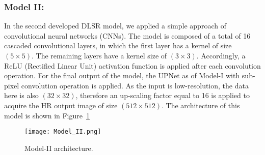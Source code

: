 \subsubsection{Model II:}
In the second developed DLSR model, we applied a simple approach of convolutional neural networks (CNNs). 
The model is composed of a total of 16 cascaded convolutional layers, in which the first layer has a kernel of size \((5\times 5)\).
The remaining layers have a kernel size of \((3\times 3)\). 
Accordingly, a ReLU (Rectified Linear Unit) activation function is applied 
after each convolution operation.
For the final output of the model, the UPNet as of Model-I with sub-pixel 
convolution operation is applied. 
As the input is low-resolution, the data here is also \((32\times 32)\), therefore an up-scaling factor equal to 16 is applied to acquire the HR output image of size \((512\times 512)\). 
The architecture of this model is shown in Figure~\ref{fig:Model_II}
\begin{figure} [ht!]
	\begin{center}
		\texttt{[image: Model\_II.png]}
	\end{center}
	\caption{Model-II architecture.} 
	\label{fig:Model_II}
\end{figure}
\clearpage
